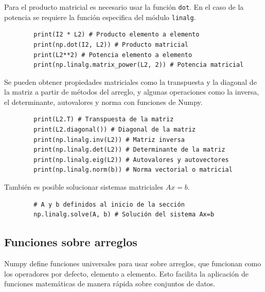 Para el producto matricial es necesario usar la función \texttt{dot}. En
el caso de la potencia se requiere la función especifica del módulo
\texttt{linalg}.

\begin{listing}[H]
    \begin{verbatim}
        print(I2 * L2) # Producto elemento a elemento
        print(np.dot(I2, L2)) # Producto matricial
        print(L2**2) # Potencia elemento a elemento
        print(np.linalg.matrix_power(L2, 2)) # Potencia matricial
    \end{verbatim}
\end{listing}


Se pueden obtener propiedades matriciales como la transpuesta y la
diagonal de la matriz a partir de métodos del arreglo, y algunas
operaciones como la inversa, el determinante, autovalores y norma con
funciones de Numpy.

\begin{listing}[H]
    \begin{verbatim}
        print(L2.T) # Transpuesta de la matriz
        print(L2.diagonal()) # Diagonal de la matriz
        print(np.linalg.inv(L2)) # Matriz inversa
        print(np.linalg.det(L2)) # Determinante de la matriz
        print(np.linalg.eig(L2)) # Autovalores y autovectores
        print(np.linalg.norm(b)) # Norma vectorial o matricial
    \end{verbatim}
\end{listing}

También es posible solucionar sistemas matriciales \(Ax=b\).

\begin{listing}[H]
    \begin{verbatim}
        # A y b definidos al inicio de la sección
        np.linalg.solve(A, b) # Solución del sistema Ax=b
    \end{verbatim}
\end{listing}

\subsection{Funciones sobre arreglos}

Numpy define funciones universales para usar sobre arreglos, que
funcionan como los operadores por defecto, elemento a elemento. Esto
facilita la aplicación de funciones matemáticas de manera rápida sobre
conjuntos de datos.

